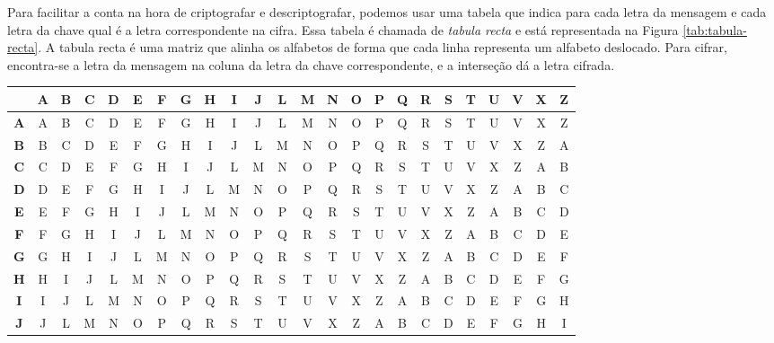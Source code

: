 Para facilitar a conta na hora de criptografar e descriptografar, podemos usar uma tabela que indica para cada letra da mensagem e cada letra da chave qual é a letra correspondente na cifra.
Essa tabela é chamada de {\em tabula recta} e está representada na Figura \ref{tab:tabula-recta}.
A tabula recta é uma matriz que alinha os alfabetos de forma que cada linha representa um alfabeto deslocado.
Para cifrar, encontra-se a letra da mensagem na coluna da letra da chave correspondente, e a interseção dá a letra cifrada.

\begin{table}[htbp]
  \centering
  \begin{small}
  \setlength{\tabcolsep}{11pt} 
\begin{tabular}{|@{}c@{}|*{23}{@{}c@{}|}}
\hline
\textbf{} & \textbf{A} & \textbf{B} & \textbf{C} & \textbf{D} & \textbf{E} & \textbf{F} & \textbf{G} & \textbf{H} & \textbf{I} & \textbf{J} & \textbf{L} & \textbf{M} & \textbf{N} & \textbf{O} & \textbf{P} & \textbf{Q} & \textbf{R} & \textbf{S} & \textbf{T} & \textbf{U} & \textbf{V} & \textbf{X} & \textbf{Z} \\
\hline
\textbf{A} & A & B & C & D & E & F & G & H & I & J & L & M & N & O & P & Q & R & S & T & U & V & X & Z \\
\hline
\textbf{B} & B & C & D & E & F & G & H & I & J & L & M & N & O & P & Q & R & S & T & U & V & X & Z & A \\
\hline
\textbf{C} & C & D & E & F & G & H & I & J & L & M & N & O & P & Q & R & S & T & U & V & X & Z & A & B \\
\hline
\textbf{D} & D & E & F & G & H & I & J & L & M & N & O & P & Q & R & S & T & U & V & X & Z & A & B & C \\
\hline
\textbf{E} & E & F & G & H & I & J & L & M & N & O & P & Q & R & S & T & U & V & X & Z & A & B & C & D \\
\hline
\textbf{F} & F & G & H & I & J & L & M & N & O & P & Q & R & S & T & U & V & X & Z & A & B & C & D & E \\
\hline
\textbf{G} & G & H & I & J & L & M & N & O & P & Q & R & S & T & U & V & X & Z & A & B & C & D & E & F \\
\hline
\textbf{H} & H & I & J & L & M & N & O & P & Q & R & S & T & U & V & X & Z & A & B & C & D & E & F & G \\
\hline
\textbf{I} & I & J & L & M & N & O & P & Q & R & S & T & U & V & X & Z & A & B & C & D & E & F & G & H \\
\hline
\textbf{J} & J & L & M & N & O & P & Q & R & S & T & U & V & X & Z & A & B & C & D & E & F & G & H & I \\

\end{tabular}
\end{small}
\end{table}
